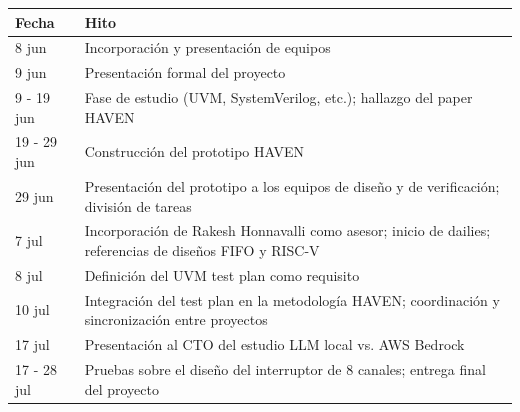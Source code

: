 \begin{center}
\begin{tabular}{@{}p{3cm}p{11.5cm}@{}}
\hline
\textbf{Fecha} & \textbf{Hito} \\
\hline
8 jun & Incorporación y presentación de equipos \\
9 jun & Presentación formal del proyecto \\
9 - 19 jun & Fase de estudio (UVM, SystemVerilog, etc.); hallazgo del paper HAVEN \cite{meng2026}\\
19 - 29 jun & Construcción del prototipo HAVEN \\
29 jun & Presentación del prototipo a los equipos de diseño y de verificación; división de tareas \\
7 jul & Incorporación de Rakesh Honnavalli como asesor; inicio de dailies; referencias de diseños FIFO y RISC-V \\
8 jul & Definición del UVM test plan como requisito \\
10 jul & Integración del test plan en la metodología HAVEN; coordinación y sincronización entre proyectos \\
17 jul & Presentación al CTO del estudio LLM local vs. AWS Bedrock \\
17 - 28 jul & Pruebas sobre el diseño del interruptor de 8 canales; entrega final del proyecto \\
\hline
\end{tabular}
\end{center}
